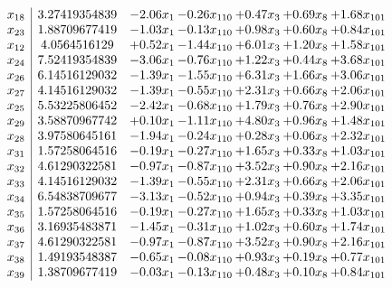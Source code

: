 \documentclass[8pt]{article}
\begin{document}
\[\begin{array}{c| c c@{\hskip 2pt} c@{\hskip 2pt} c@{\hskip 2pt} c@{\hskip 2pt} c@{\hskip 2pt} }
 x_{18}   &  3.27419354839 & -2.06 x_{1} & -0.26 x_{110} & +  0.47 x_{3} & +  0.69 x_{8} & +  1.68 x_{101}\\
 x_{23}   &  1.88709677419 & -1.03 x_{1} & -0.13 x_{110} & +  0.98 x_{3} & +  0.60 x_{8} & +  0.84 x_{101}\\
 x_{12}   &  4.0564516129 & +  0.52 x_{1} & -1.44 x_{110} & +  6.01 x_{3} & +  1.20 x_{8} & +  1.58 x_{101}\\
 x_{24}   &  7.52419354839 & -3.06 x_{1} & -0.76 x_{110} & +  1.22 x_{3} & +  0.44 x_{8} & +  3.68 x_{101}\\
 x_{26}   &  6.14516129032 & -1.39 x_{1} & -1.55 x_{110} & +  6.31 x_{3} & +  1.66 x_{8} & +  3.06 x_{101}\\
 x_{27}   &  4.14516129032 & -1.39 x_{1} & -0.55 x_{110} & +  2.31 x_{3} & +  0.66 x_{8} & +  2.06 x_{101}\\
 x_{25}   &  5.53225806452 & -2.42 x_{1} & -0.68 x_{110} & +  1.79 x_{3} & +  0.76 x_{8} & +  2.90 x_{101}\\
 x_{29}   &  3.58870967742 & +  0.10 x_{1} & -1.11 x_{110} & +  4.80 x_{3} & +  0.96 x_{8} & +  1.48 x_{101}\\
 x_{28}   &  3.97580645161 & -1.94 x_{1} & -0.24 x_{110} & +  0.28 x_{3} & +  0.06 x_{8} & +  2.32 x_{101}\\
 x_{31}   &  1.57258064516 & -0.19 x_{1} & -0.27 x_{110} & +  1.65 x_{3} & +  0.33 x_{8} & +  1.03 x_{101}\\
 x_{32}   &  4.61290322581 & -0.97 x_{1} & -0.87 x_{110} & +  3.52 x_{3} & +  0.90 x_{8} & +  2.16 x_{101}\\
 x_{33}   &  4.14516129032 & -1.39 x_{1} & -0.55 x_{110} & +  2.31 x_{3} & +  0.66 x_{8} & +  2.06 x_{101}\\
 x_{34}   &  6.54838709677 & -3.13 x_{1} & -0.52 x_{110} & +  0.94 x_{3} & +  0.39 x_{8} & +  3.35 x_{101}\\
 x_{35}   &  1.57258064516 & -0.19 x_{1} & -0.27 x_{110} & +  1.65 x_{3} & +  0.33 x_{8} & +  1.03 x_{101}\\
 x_{36}   &  3.16935483871 & -1.45 x_{1} & -0.31 x_{110} & +  1.02 x_{3} & +  0.60 x_{8} & +  1.74 x_{101}\\
 x_{37}   &  4.61290322581 & -0.97 x_{1} & -0.87 x_{110} & +  3.52 x_{3} & +  0.90 x_{8} & +  2.16 x_{101}\\
 x_{38}   &  1.49193548387 & -0.65 x_{1} & -0.08 x_{110} & +  0.93 x_{3} & +  0.19 x_{8} & +  0.77 x_{101}\\
 x_{39}   &  1.38709677419 & -0.03 x_{1} & -0.13 x_{110} & +  0.48 x_{3} & +  0.10 x_{8} & +  0.84 x_{101}\\

\end{array}\]
\end{document}
